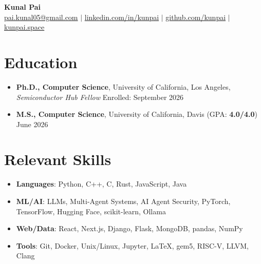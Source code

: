 \documentclass[letterpaper,10pt]{article}
\begin{document}
{\Large
\begin{center}
  \textbf{\Huge Kunal Pai} \\
  \small \href{mailto:pai.kunal05@gmail.com}{pai.kunal05@gmail.com} $|$ \href{https://linkedin.com/in/kunpai}{linkedin.com/in/kunpai} $|$ \href{https://github.com/kunpai}{github.com/kunpai} $|$ \href{https://www.kunpai.space}{kunpai.space}
\end{center}
}

\section{Education}
{\normalsize
\begin{itemize}[leftmargin=0.15in, label={}, itemsep=0pt]
  \item \textbf{Ph.D., Computer Science}, University of California, Los Angeles, \textit{Semiconductor Hub Fellow} \hfill Enrolled: September 2026
  \item \textbf{M.S., Computer Science}, University of California, Davis (GPA: \textbf{4.0/4.0}) \hfill June 2026
\end{itemize}
}

\section{Relevant Skills}
{\normalsize
\begin{itemize}[leftmargin=0.15in, label={}, itemsep=0pt]
  \item \textbf{Languages}: Python, C++, C, Rust, JavaScript, Java
  \item \textbf{ML/AI}: LLMs, Multi-Agent Systems, AI Agent Security, PyTorch, TensorFlow, Hugging Face, scikit-learn, Ollama
  \item \textbf{Web/Data}: React, Next.js, Django, Flask, MongoDB, pandas, NumPy
  \item \textbf{Tools}: Git, Docker, Unix/Linux, Jupyter, LaTeX, gem5, RISC-V, LLVM, Clang
\end{itemize}
}
\end{document}
